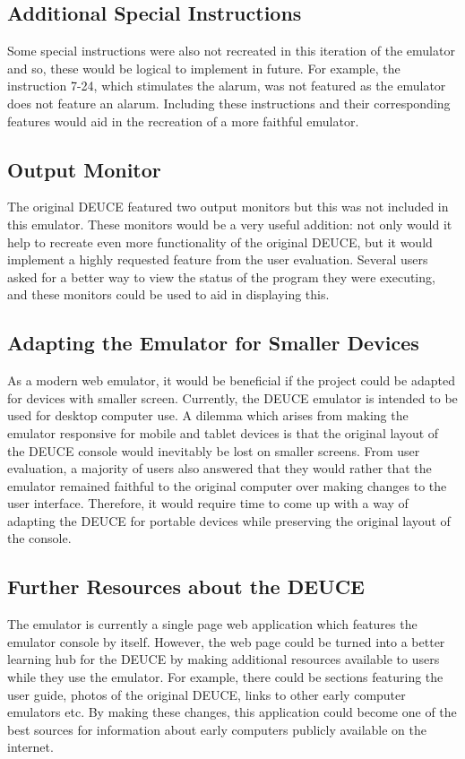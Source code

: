 \documentclass{l4proj}
\begin{document}
\subsection{Additional Special Instructions}
Some special instructions were also not recreated in this iteration of the emulator and so, these would be logical to implement in future. For example, the instruction 7-24, which stimulates the alarum, was not featured as the emulator does not feature an alarum. Including these instructions and their corresponding features would aid in the recreation of a more faithful emulator.

\subsection{Output Monitor}
The original DEUCE featured two output monitors but this was not included in this emulator. These monitors would be a very useful addition: not only would it help to recreate even more functionality of the original DEUCE, but it would implement a highly requested feature from the user evaluation. Several users asked for a better way to view the status of the program they were executing, and these monitors could be used to aid in displaying this.

\subsection{Adapting the Emulator for Smaller Devices}
As a modern web emulator, it would be beneficial if the project could be adapted for devices with smaller screen. Currently, the DEUCE emulator is intended to be used for desktop computer use. A dilemma which arises from making the emulator responsive for mobile and tablet devices is that the original layout of the DEUCE console would inevitably be lost on smaller screens. From user evaluation, a majority of users also answered that they would rather that the emulator remained faithful to the original computer over making changes to the user interface. Therefore, it would require time to come up with a way of adapting the DEUCE for portable devices while preserving the original layout of the console.

\subsection{Further Resources about the DEUCE}
The emulator is currently a single page web application which features the emulator console by itself. However, the web page could be turned into a better learning hub for the DEUCE by making additional resources available to users while they use the emulator. For example, there could be sections featuring the user guide, photos of the original DEUCE, links to other early computer emulators etc. By making these changes, this application could become one of the best sources for information about early computers publicly available on the internet. 
\end{document}
